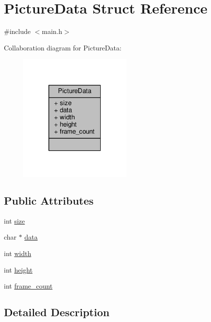 \hypertarget{structPictureData}{\section{Picture\-Data Struct Reference}
\label{structPictureData}
}


{\ttfamily \#include $<$main.\-h$>$}



Collaboration diagram for Picture\-Data\-:
\nopagebreak
\begin{figure}[H]
\begin{center}
\leavevmode
\includegraphics[width=160pt]{structPictureData__coll__graph}
\end{center}
\end{figure}
\subsection*{Public Attributes}
\begin{DoxyCompactItemize}
\item 
int \hyperlink{structPictureData_a2ca38938c35e5e26f27ea7089e8a394e}{size}
\item 
char $\ast$ \hyperlink{structPictureData_a2c18429fe90e5d541966cff885c56b16}{data}
\item 
int \hyperlink{structPictureData_a5bebf22e70c9d447b40a3bcf83906faa}{width}
\item 
int \hyperlink{structPictureData_ab0565ab5f2e7291c0b23982b1a25b2a7}{height}
\item 
int \hyperlink{structPictureData_a0ece02dd11b74f6ddd9e9d68132c4c70}{frame\-\_\-count}
\end{DoxyCompactItemize}


\subsection{Detailed Description}


